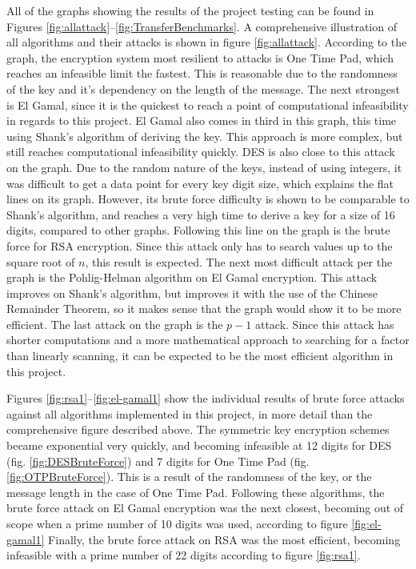 \documentclass[12pt]{report}
\begin{document}
All of the graphs showing the results of the project testing can be found in Figures \ref{fig:allattack}--\ref{fig:TransferBenchmarks}. A comprehensive illustration of
all algorithms and their attacks is shown in figure \ref{fig:allattack}. According to the graph, the encryption system most resilient to attacks is One Time Pad, which
reaches an infeasible limit the fastest. This is reasonable due to the randomness of the key and it's dependency on the length of the message. The next strongest is
El Gamal, since it is the quickest to reach a point of computational infeasibility in regards to this project. El Gamal also comes in third in this graph, this time
using Shank's algorithm of deriving the key. This approach is more complex, but still reaches computational infeasibility quickly. DES is also close to this attack on
the graph. Due to the random nature of the keys, instead of using integers, it was difficult to get a data point for every key digit size, which explains the flat
lines on its graph. However, its brute force difficulty is shown to be comparable to Shank's algorithm, and reaches a very high time to derive a key for a size of 16
digits, compared to other graphs. Following this line on the graph is the brute force for RSA encryption. Since this attack only has to search values up to the
square root of $n$, this result is expected. The next most difficult attack per the graph is the Pohlig-Helman algorithm on El Gamal encryption. This attack
improves on Shank's algorithm, but improves it with the use of the Chinese Remainder Theorem, so it makes sense that the graph would show it to be more efficient.
The last attack on the graph is the $p-1$ attack. Since this attack has shorter computations and a more mathematical approach to searching for a factor than
linearly scanning, it can be expected to be the most efficient algorithm in this project.

Figures \ref{fig:rsa1}--\ref{fig:el-gamal1} show the individual results of brute force attacks against all algorithms implemented in this project, in more detail than the
comprehensive figure described above. The symmetric key encryption schemes became exponential very quickly, and becoming infeasible at 12 digits for DES (fig.
\ref{fig:DESBruteForce}) and 7 digits for One Time Pad (fig. \ref{fig:OTPBruteForce}). This is a result of the randomness of the key, or the message length in the case of
One Time Pad. Following these algorithms, the brute force attack on El Gamal encryption was the next closest, becoming out of scope when a prime number of 10 digits was
used, according to figure \ref{fig:el-gamal1} Finally, the brute force attack on RSA was the most efficient, becoming infeasible with a prime number of 22 digits according
to figure \ref{fig:rsa1}.
\end{document}
